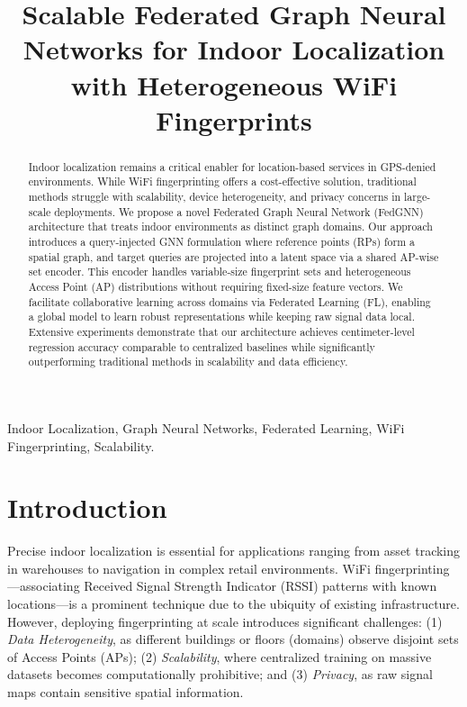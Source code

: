 \documentclass[conference]{IEEEtran}
\begin{document}
\title{Scalable Federated Graph Neural Networks for Indoor Localization with Heterogeneous WiFi Fingerprints}

\author{
}

\maketitle

\begin{abstract}
Indoor localization remains a critical enabler for location-based services in GPS-denied environments. While WiFi fingerprinting offers a cost-effective solution, traditional methods struggle with scalability, device heterogeneity, and privacy concerns in large-scale deployments. We propose a novel Federated Graph Neural Network (FedGNN) architecture that treats indoor environments as distinct graph domains. Our approach introduces a query-injected GNN formulation where reference points (RPs) form a spatial graph, and target queries are projected into a latent space via a shared AP-wise set encoder. This encoder handles variable-size fingerprint sets and heterogeneous Access Point (AP) distributions without requiring fixed-size feature vectors. We facilitate collaborative learning across domains via Federated Learning (FL), enabling a global model to learn robust representations while keeping raw signal data local. Extensive experiments demonstrate that our architecture achieves centimeter-level regression accuracy comparable to centralized baselines while significantly outperforming traditional methods in scalability and data efficiency.
\end{abstract}

\begin{IEEEkeywords}
Indoor Localization, Graph Neural Networks, Federated Learning, WiFi Fingerprinting, Scalability.
\end{IEEEkeywords}

\section{Introduction}
Precise indoor localization is essential for applications ranging from asset tracking in warehouses to navigation in complex retail environments. WiFi fingerprinting---associating Received Signal Strength Indicator (RSSI) patterns with known locations---is a prominent technique due to the ubiquity of existing infrastructure. However, deploying fingerprinting at scale introduces significant challenges: (1) \textit{Data Heterogeneity}, as different buildings or floors (domains) observe disjoint sets of Access Points (APs); (2) \textit{Scalability}, where centralized training on massive datasets becomes computationally prohibitive; and (3) \textit{Privacy}, as raw signal maps contain sensitive spatial information.
\end{document}
